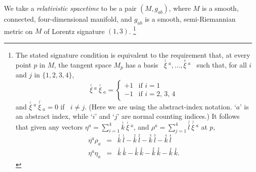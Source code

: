 \documentclass [12] {article}
\theoremstyle{plain}
\numberwithin{figure}{subsection}
\numberwithin{proposition}{subsection}
\begin{document}
We take a \emph{relativistic spacetime} to be a pair $(M, g_{ab})$, where $M$ is a smooth, connected, four-dimensional manifold, and $g_{ab}$ is a smooth, semi-Riemannian metric on $M$ of Lorentz signature $(1,3)$.%
\footnote{The stated signature condition is equivalent to the requirement that, at every point $p$ in $M$, the tangent space $M_p$ has a basis \ $\overset{_1}{\xi} \ \! \!^a ,...,
\overset{_4}{\xi} \ \!\!^a$  \ such that, for all $i$ and $j$ in $\{1,2,3,4\}$,
\[
\overset{_i}{\xi} \ \! \!^a \ \overset{_i}{\xi} \ \! \!_a   = \left\{
\begin{array}{ll}
+1 & \mbox{if  \ $i=1$}\\
-1 & \mbox{if \  $i = 2, \, 3, \,  4$}
\end{array}
\right.
\]
and
$\overset{_i}{\xi} \ \! \!^a \ \overset{_j}{\xi} \ \! \!_a   = 0$ if  \ $i\ne j$. 
(Here we are using the abstract-index notation.  `$a$' is an abstract index, while `$i$' and `$j$' are normal counting indices.)   It follows that given any vectors  $\eta^a = \sum_{i=1}^4 \overset{_i}{k}  \ \overset{_i}{\xi} \ \! \!^a$, and
$\rho^a = \sum_{j=1}^4 \overset{_j}{l}  \ \overset{_j}{\xi} \ \! \!^a$ at $p$,
\begin{eqnarray*}
\eta^a \rho_a  & = &  
	\overset{_1}{k} \ \overset{_1}{l} - 	\overset{_2}{k} \ \overset{_2}{l} - 	\overset{_3}{k} \ \overset{_3}{l} - 	\overset{_4}{k} \ \overset{_4}{l}   \\
\eta^a \eta_a   & = &  \overset{_1}{k} \ \overset{_1}{k} - 	\overset{_2}{k} \ \overset{_2}{k} - 	\overset{_3}{k} \ \overset{_3}{k} - 	\overset{_4}{k} \ \overset{_4}{k}.   
\end{eqnarray*} 
\vspace{-1.5em}
}
\end{document}

